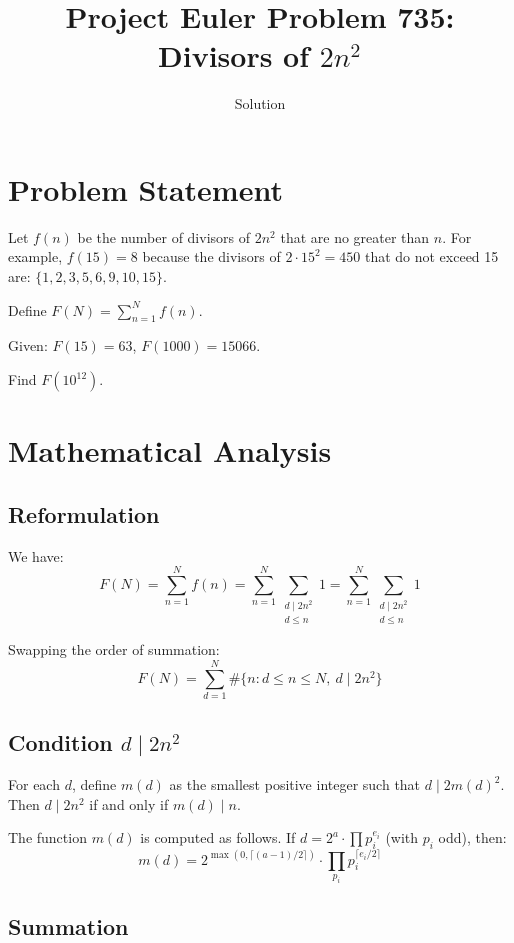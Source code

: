 \documentclass[12pt]{article}
\title{Project Euler Problem 735: Divisors of $2n^2$}
\author{Solution}
\date{}
\begin{document}
\maketitle

\section{Problem Statement}

Let $f(n)$ be the number of divisors of $2n^2$ that are no greater than $n$. For example, $f(15) = 8$ because the divisors of $2 \cdot 15^2 = 450$ that do not exceed 15 are: $\{1, 2, 3, 5, 6, 9, 10, 15\}$.

Define $F(N) = \sum_{n=1}^{N} f(n)$.

Given: $F(15) = 63$, $F(1000) = 15066$.

Find $F(10^{12})$.

\section{Mathematical Analysis}

\subsection{Reformulation}

We have:
\[
F(N) = \sum_{n=1}^{N} f(n) = \sum_{n=1}^{N} \sum_{\substack{d \mid 2n^2 \\ d \leq n}} 1
= \sum_{n=1}^{N} \sum_{\substack{d \mid 2n^2 \\ d \leq n}} 1
\]

Swapping the order of summation:
\[
F(N) = \sum_{d=1}^{N} \#\{n : d \leq n \leq N,\ d \mid 2n^2\}
\]

\subsection{Condition $d \mid 2n^2$}

For each $d$, define $m(d)$ as the smallest positive integer such that $d \mid 2m(d)^2$. Then $d \mid 2n^2$ if and only if $m(d) \mid n$.

The function $m(d)$ is computed as follows. If $d = 2^a \cdot \prod p_i^{e_i}$ (with $p_i$ odd), then:
\[
m(d) = 2^{\max(0, \lceil (a-1)/2 \rceil)} \cdot \prod_{p_i} p_i^{\lceil e_i/2 \rceil}
\]

\subsection{Summation}
\end{document}
